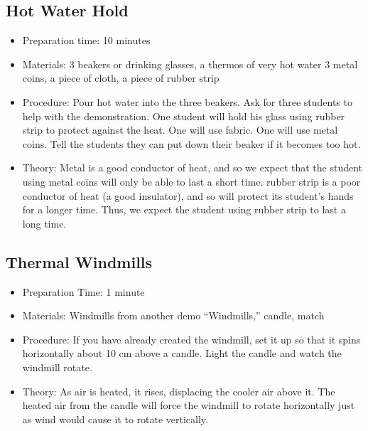 \subsection{Hot Water Hold}
\begin{itemize}
\item{Preparation time: 10 minutes}
\item{Materials: 3 beakers or drinking glasses, a thermos of very hot water 3 metal coins, a piece of cloth, a piece of rubber strip}
\item{Procedure: Pour hot water into the three beakers. Ask for three students to help with the demonstration. One student will hold his glass using rubber strip to protect against the heat. One will use fabric. One will use metal coins. Tell the students they can put down their beaker if it becomes too hot.}
\item{Theory: Metal is a good conductor of heat, and so we expect that the student using metal coins will only be able to last a short time. rubber strip is a poor conductor of heat (a good insulator), and so will protect its student’s hands for a longer time. Thus, we expect the student using rubber strip to last a long time.}
\end{itemize}

\subsection{Thermal Windmills}
\begin{itemize}
\item{Preparation Time: 1 minute}
\item{Materials: Windmills from another demo “Windmills,” candle, match}
\item{Procedure: If you have already created the windmill, set it up so that it spins horizontally about 10 cm above a candle. Light the candle and watch the windmill rotate.}
\item{Theory: As air is heated, it rises, displacing the cooler air above it. The heated air from the candle will force the windmill to rotate horizontally just as wind would cause it to rotate vertically.}
\end{itemize}

